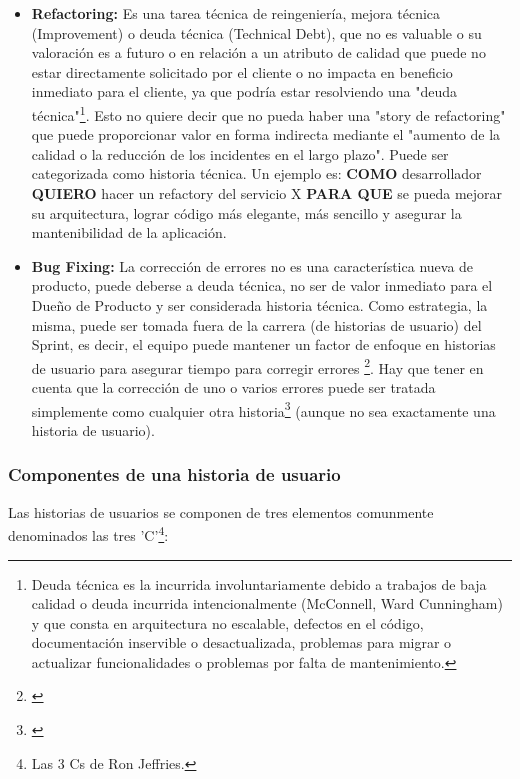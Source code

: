 \begin{itemize}
\item \textbf{Refactoring:}
Es una tarea técnica de reingeniería, mejora técnica (Improvement) o deuda técnica (Technical Debt), que no es valuable o su valoración es a futuro o en relación a un atributo de calidad que puede no estar directamente solicitado por el cliente o no impacta en beneficio inmediato para el cliente, ya que podría estar resolviendo una "deuda técnica"\footnote{Deuda técnica es la incurrida involuntariamente debido a trabajos de baja calidad o deuda incurrida intencionalmente (McConnell, Ward Cunningham) y que consta en arquitectura no escalable, defectos en el código, documentación inservible o desactualizada, problemas para migrar o actualizar funcionalidades o problemas por falta de mantenimiento.}. Esto no quiere decir que no pueda haber una "story de refactoring" que puede proporcionar valor en forma indirecta mediante el "aumento de la calidad o la reducción de los incidentes en el largo plazo". Puede ser categorizada como historia técnica.
Un ejemplo es: \textbf{COMO} desarrollador \textbf{QUIERO} hacer un refactory del servicio X \textbf{PARA QUE} se pueda mejorar su arquitectura, lograr código más elegante, más sencillo y asegurar la mantenibilidad de la aplicación.\newline

\item \textbf{Bug Fixing:} La corrección de errores no es una característica nueva de producto, puede deberse a deuda técnica, no ser de valor inmediato para el Dueño de Producto y ser considerada historia técnica. Como estrategia, la misma, puede ser tomada fuera de la carrera (de historias de usuario) del Sprint, es decir, el equipo puede mantener un factor de enfoque en historias de usuario para asegurar tiempo para corregir errores \footnote{\cite{Henrik-Kniberg-2007}}. Hay que tener en cuenta que la corrección de uno o varios errores puede ser tratada simplemente como cualquier otra historia\footnote{\cite{Cohn-2004}} (aunque no sea exactamente una historia de usuario).\newline

\end{itemize}

\subsubsection{Componentes de una historia de usuario}

Las historias de usuarios se componen de tres elementos comunmente denominados las tres 'C'\footnote{Las 3 Cs de Ron Jeffries.}:

